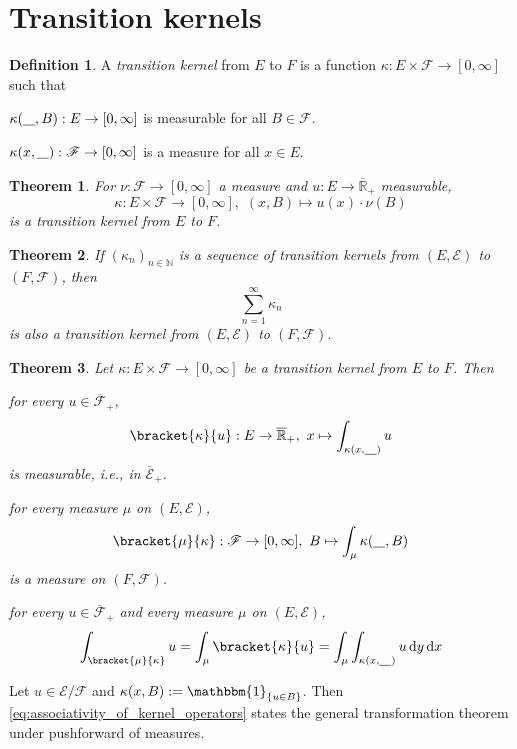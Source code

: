 \documentclass[11pt, a4paper, openany]{book}
\newtheorem{thm}{Theorem}\newtheorem{lem}{Lemma}\newtheorem{crl}{Corollary}
\theoremstyle{definition}
\newtheorem{define}{Definition}\newtheorem{exam}{Example}\newtheorem{remark}{Remark}
\newcommand{\ph}{\underline{\hspace{0.3cm}}}
\newcommand{\er}{\overline{\mathbb{R}}}
\newenvironment{tight_enumerate}{\begin{enumerate}\itemsep -0.2em}{\end{enumerate}}
\begin{document}
\section{Transition kernels}
    \begin{define}
        A \textit{transition kernel} from $E$ to $F$ is a function $\kappa:E\times\mathscr{F}\rightarrow [0,\infty]$ such that
        \begin{tight_enumerate}
            \item $\kappa(\ph,B):E\rightarrow [0,\infty]$ is measurable for all $B\in\mathscr{F}$.
            \item $\kappa(x,\ph):\mathscr{F}\rightarrow [0,\infty]$ is a measure for all $x\in E$.
        \end{tight_enumerate}
    \end{define}
    \begin{thm}
        For $\nu:\mathscr{F}\rightarrow [0,\infty]$ a measure and $u:E\rightarrow \er_+$ measurable,
        \[
            \kappa:E\times\mathscr{F}\rightarrow [0,\infty],\,\,(x,B)\mapsto u(x)\cdot \nu(B)
        \]
        is a transition kernel from $E$ to $F$.
    \end{thm}
    \begin{thm}
        If $(\kappa_n)_{n\in\mathbb{N}}$ is a sequence of transition kernels from $(E,\mathscr{E})$ to $(F,\mathscr{F})$, then
        \[
            \sum_{n=1}^\infty \kappa_n
        \]
        is also a transition kernel from $(E,\mathscr{E})$ to $(F,\mathscr{F})$.
    \end{thm}
    \begin{thm}
        Let $\kappa:E\times\mathscr{F}\rightarrow [0,\infty]$ be a transition kernel from $E$ to $F$. Then
        \begin{tight_enumerate}
            \item for every $u\in\overline{\mathscr{F}}_+$,
            \[
                \bracket{\kappa}{u}:E\rightarrow \er_+,\,\,x\mapsto \int_{\kappa(x,\ph)}u
            \]
            is measurable, i.e., in $\overline{\mathscr{E}}_+$.
            \item for every measure $\mu$ on $(E,\mathscr{E})$,
            \[
                \bracket{\mu}{\kappa}:\mathscr{F}\rightarrow [0,\infty],\,\,B\mapsto \int_\mu \kappa(\ph,B)
            \]
            is a measure on $(F,\mathscr{F})$.
            \item for every $u\in \overline{\mathscr{F}}_+$ and every measure $\mu$ on $(E,\mathscr{E})$,
            \begin{equation}\label{eq:associativity_of_kernel_operators}
                \int_{\bracket{\mu}{\kappa}}u=\int_{\mu}\bracket{\kappa}{u}=\int_{\mu}\int_{\kappa(x,\ph)}u\odif y\odif x
            \end{equation}
        \end{tight_enumerate}
    \end{thm}
    Let $u\in \mathscr{E}/\mathscr{F}$ and $\kappa(x,B):=\mathbbm{1}_{\{u\in B\}}$. Then \eqref{eq:associativity_of_kernel_operators} states the general transformation theorem under pushforward of measures.
\end{document}
